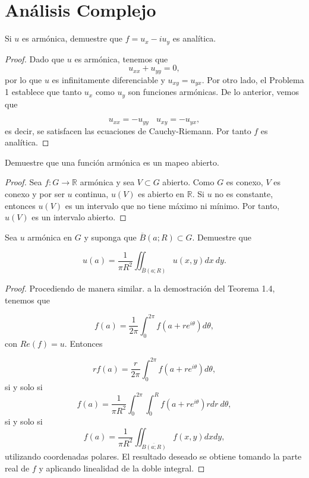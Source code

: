 \documentclass[12pt]{article}
\newcommand{\R}{\mathbb{R}}
\newenvironment{problem}[2][Problema]{\begin{trivlist}
\item[\hskip \labelsep {\bfseries #1}\hskip \labelsep {\bfseries #2.}]}{\end{trivlist}}
\begin{document}
\section*{Análisis Complejo}

\begin{problem}{2 pp. 255}
Si $u$ es armónica, demuestre que $f = u_x - iu_y$ es analítica. 
\end{problem}
\begin{proof}
Dado que $u$ es armónica, tenemos que 
$$u_{xx} + u_{yy} = 0,$$
por lo que $u$ es infinitamente diferenciable y  $u_{xy}  = u_{yx}.$ Por otro lado, el Problema 1 establece que tanto $u_x$ como $u_y$ son funciones armónicas. De lo anterior, vemos que 

$$ u_{xx} = - u_{yy} \ \ \ \ u_{x y} = - u_{yx},$$
es decir, se satisfacen las ecuaciones de Cauchy-Riemann. Por tanto $f$ es analítica.
\end{proof}


\begin{problem}{4 pp. 255}
Demuestre que una función armónica es un mapeo abierto.
\end{problem}
\begin{proof}
Sea $f: G \rightarrow \R$ armónica y sea $V \subset G$ abierto. Como $G$ es conexo, $V$ es conexo y por ser $u$ continua, $u(V)$ es abierto en $\R$. Si $u$ no es constante, entonces $u(V)$ es un intervalo que no tiene máximo ni mínimo. Por tanto, $u(V)$ es un intervalo abierto. 
\end{proof}


\begin{problem}{6 pp. 255}
Sea $u$ armónica en $G$ y suponga que $\overline{B}(a;R) \subset G$. Demuestre que 

$$u(a) = \frac{1}{\pi R^2} \iint_{\overline{B}(a;R)} u(x,y) dx \ dy.$$
\end{problem}
\begin{proof}
Procediendo de manera similar. a la demostración del Teorema 1.4, tenemos que

$$f(a) = \frac{1}{2\pi} \int_0^{2\pi} f(a + re^{i\theta}) d \theta,$$
con $Re (f) = u.$ Entonces

$$r f(a) = \frac{r}{2\pi} \int_0^{2\pi} f(a + re^{i\theta}) d \theta,
$$
si y solo si
$$ f(a) = \frac{1}{\pi R^2} \int_0^{2\pi} \int_0^R f(a+re^{i \theta })r dr \ d\theta,$$
si y solo si 
$$ f(a) = \frac{1}{\pi R^2} \iint_{\overline{B(a; R)}} f(x,y) dx dy, $$
utilizando coordenadas polares. El resultado deseado se obtiene tomando la parte real de $f$ y aplicando linealidad de la doble integral.


\end{proof}
\end{document}
